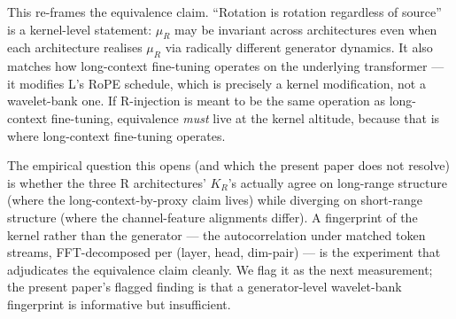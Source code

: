 \documentclass[10pt, twocolumn, a4paper]{article}
\begin{document}
This re-frames the equivalence claim. ``Rotation is rotation regardless of source'' is a kernel-level statement: $\mu_R$ may be invariant across architectures even when each architecture realises $\mu_R$ via radically different generator dynamics. It also matches how long-context fine-tuning operates on the underlying transformer --- it modifies L's RoPE schedule, which is precisely a kernel modification, not a wavelet-bank one. If R-injection is meant to be the same operation as long-context fine-tuning, equivalence \emph{must} live at the kernel altitude, because that is where long-context fine-tuning operates.

The empirical question this opens (and which the present paper does not resolve) is whether the three R architectures' $K_R$'s actually agree on long-range structure (where the long-context-by-proxy claim lives) while diverging on short-range structure (where the channel-feature alignments differ). A fingerprint of the kernel rather than the generator --- the autocorrelation under matched token streams, FFT-decomposed per (layer, head, dim-pair) --- is the experiment that adjudicates the equivalence claim cleanly. We flag it as the next measurement; the present paper's flagged finding is that a generator-level wavelet-bank fingerprint is informative but insufficient.
\end{document}
